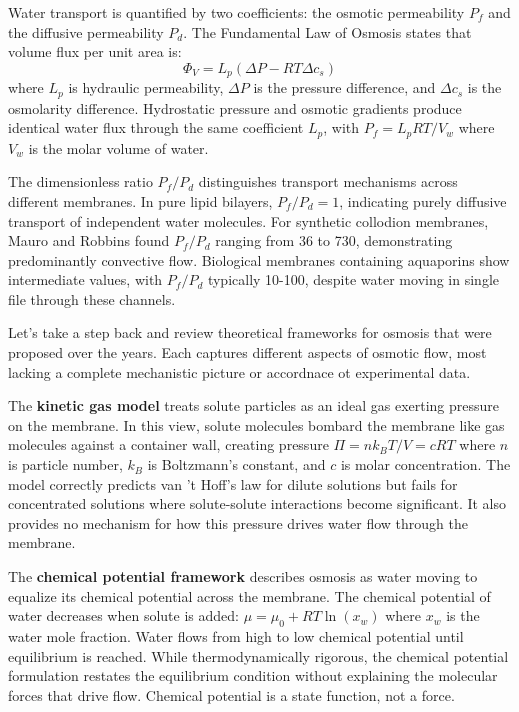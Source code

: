 Water transport is quantified by two coefficients: the osmotic permeability $P_f$ and the diffusive permeability $P_d$. The Fundamental Law of Osmosis states that volume flux per unit area is:
\[
\Phi_V = L_p(\Delta P - RT\Delta c_s)
\]
where $L_p$ is hydraulic permeability, $\Delta P$ is the pressure difference, and $\Delta c_s$ is the osmolarity difference. Hydrostatic pressure and osmotic gradients produce identical water flux through the same coefficient $L_p$, with $P_f = L_p RT/V_w$ where $V_w$ is the molar volume of water.

The dimensionless ratio $P_f/P_d$ distinguishes transport mechanisms across different membranes. In pure lipid bilayers, $P_f/P_d = 1$, indicating purely diffusive transport of independent water molecules. For synthetic collodion membranes, Mauro and Robbins found $P_f/P_d$ ranging from 36 to 730, demonstrating predominantly convective flow. Biological membranes containing aquaporins show intermediate values, with $P_f/P_d$ typically 10-100, despite water moving in single file through these channels.

Let's take a step back and review theoretical frameworks for osmosis that were proposed over the years. Each captures different aspects of osmotic flow, most lacking a complete mechanistic picture or accordnace ot experimental data.

The \textbf{kinetic gas model} treats solute particles as an ideal gas exerting pressure on the membrane. In this view, solute molecules bombard the membrane like gas molecules against a container wall, creating pressure $\Pi = nk_B T/V = cRT$ where $n$ is particle number, $k_B$ is Boltzmann's constant, and $c$ is molar concentration. The model correctly predicts van 't Hoff's law for dilute solutions but fails for concentrated solutions where solute-solute interactions become significant. It also provides no mechanism for how this pressure drives water flow through the membrane.

The \textbf{chemical potential framework} describes osmosis as water moving to equalize its chemical potential across the membrane. The chemical potential of water decreases when solute is added: $\mu = \mu_0 + RT \ln(x_w)$ where $x_w$ is the water mole fraction. Water flows from high to low chemical potential until equilibrium is reached. While thermodynamically rigorous, the chemical potential formulation restates the equilibrium condition without explaining the molecular forces that drive flow. Chemical potential is a state function, not a force.

